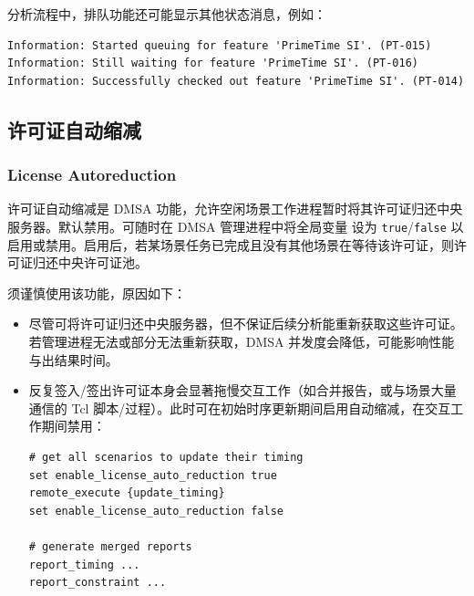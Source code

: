 分析流程中，排队功能还可能显示其他状态消息，例如：
\begin{lstlisting}
Information: Started queuing for feature 'PrimeTime SI'. (PT-015)
Information: Still waiting for feature 'PrimeTime SI'. (PT-016)
Information: Successfully checked out feature 'PrimeTime SI'. (PT-014)
\end{lstlisting}

\subsection{许可证自动缩减}
\subsubsection*{License Autoreduction}

许可证自动缩减是 DMSA 功能，允许空闲场景工作进程暂时将其许可证归还中央服务器。默认禁用。可随时在 DMSA 管理进程中将全局变量  设为 \texttt{true}/\texttt{false} 以启用或禁用。启用后，若某场景任务已完成且没有其他场景在等待该许可证，则许可证归还中央许可证池。

须谨慎使用该功能，原因如下：
\begin{itemize}
  \item 尽管可将许可证归还中央服务器，但不保证后续分析能重新获取这些许可证。若管理进程无法或部分无法重新获取，DMSA 并发度会降低，可能影响性能与出结果时间。
  \item 反复签入/签出许可证本身会显著拖慢交互工作（如合并报告，或与场景大量通信的 Tcl 脚本/过程）。此时可在初始时序更新期间启用自动缩减，在交互工作期间禁用：
\begin{lstlisting}
# get all scenarios to update their timing
set enable_license_auto_reduction true
remote_execute {update_timing}
set enable_license_auto_reduction false

# generate merged reports
report_timing ...
report_constraint ...
\end{lstlisting}
\end{itemize}
